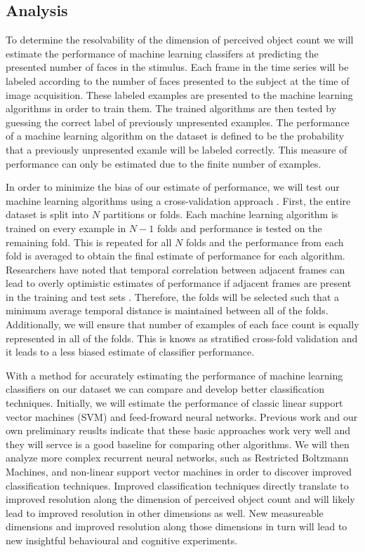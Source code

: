 \documentclass[12pt]{article}
\begin{document}
\subsection{Analysis}
To determine the resolvability of the dimension of perceived object count we will estimate the performance of machine learning classifers at predicting the presented number of faces in the stimulus.
Each frame in the time series will be labeled according to the number of faces presented to the subject at the time of image acquisition.
These labeled examples are presented to the machine learning algorithms in order to train them.
The trained algorithms are then tested by guessing the correct label of previously unpresented examples.
The performance of a machine learning algorithm on the dataset is defined to be the probability that a previously unpresented examle will be labeled correctly.
This measure of performance can only be estimated due to the finite number of examples.

In order to minimize the bias of our estimate of performance, we will test our machine learning algorithms using a cross-validation approach \cite{Kohavi1995}.
First, the entire dataset is split into $N$ partitions or folds.
Each machine learning algorithm is trained on every example in $N-1$ folds and performance is tested on the remaining fold.
This is repeated for all $N$ folds and the performance from each fold is averaged to obtain the final estimate of performance for each algorithm.
Researchers have noted that temporal correlation between adjacent frames can lead to overly optimistic estimates of performance if adjacent frames are present in the training and test sets \cite{Pereira2009}.
Therefore, the folds will be selected such that a minimum average temporal distance is maintained between all of the folds.
Additionally, we will ensure that number of examples of each face count is equally represented in all of the folds.
This is knows as stratified cross-fold validation \cite{Kohavi1995} and it leads to a less biased estimate of classifier performance.

With a method for accurately estimating the performance of machine learning classifiers on our dataset we can compare and develop better classification techniques.
Initially, we will estimate the performance of classic linear support vector machines (SVM) and feed-froward neural networks.
Previous work and our own preliminary reuslts indicate that these basic approaches work very well and they will servce is a good baseline for comparing other algorithms.
We will then analyze more complex recurrent neural networks, such as Restricted Boltzmann Machines, and non-linear support vector machines in order to discover improved classification techniques.
Improved classification techniques directly translate to improved resolution along the dimension of perceived object count and will likely lead to improved resolution in other dimensions as well.
New measureable dimensions and improved resolution along those dimensions in turn will lead to new insightful behavioural and cognitive experiments.


\end{document}
